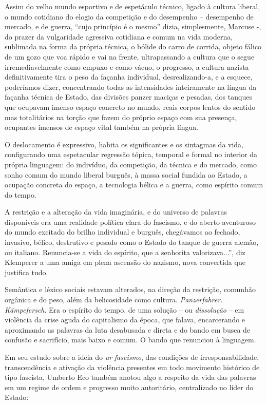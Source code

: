 Assim do velho mundo esportivo e de espetáculo técnico, ligado à cultura
liberal, o mundo cotidiano do elogio da competição e do desempenho --
desempenho de mercado, e de guerra, ``cujo princípio é o mesmo'' dizia,
simplesmente, Marcuse -, do prazer da vulgaridade agressiva cotidiana e
comum na vida moderna, sublimada na forma da própria técnica, o bólide
do carro de corrida, objeto fálico de um gozo que voa rápido e vai na
frente, ultrapassando a cultura que o segue irremediavelmente como
empuxo e como vácuo, o progresso, a cultura nazista definitivamente tira
o peso da façanha individual, desrealizando-a, e a esquece, poderíamos
dizer, concentrando todas as intensidades inteiramente na língua da
façanha técnica de Estado, das divisões panzer maciças e pesadas, dos
tanques que ocupavam imenso espaço concreto no mundo, reais corpos
lentos do sentido mas totalitários na torção que fazem do próprio espaço
com sua presença, ocupantes imensos de espaço vital também na própria
língua.

O deslocamento é expressivo, habita os significantes e os sintagmas da
vida, configurando uma espetacular regressão tópica, temporal e formal
no interior da própria linguagem: do indivíduo, da competição, da
técnica e do mercado, como sonho comum do mundo liberal burguês, à massa
social fundida ao Estado, a ocupação concreta do espaço, a tecnologia
bélica e a guerra, como espírito comum do tempo.

A restrição e a alteração da vida imaginária, e do universo de palavras
disponíveis era uma realidade política clara do fascismo, e do aberto
aventuroso do mundo excitado do brilho individual e burguês, chegávamos
ao fechado, invasivo, bélico, destrutivo e pesado como o Estado do
tanque de guerra alemão, ou italiano. Renuncia-se a vida do espírito,
que a senhorita valorizava...'', diz Klemperer a uma amiga em plena
ascensão do nazismo, nova convertida que justifica tudo.

Semântica e léxico sociais estavam alterados, na direção da restrição,
comunhão orgânica e do peso, além da belicosidade como cultura.
\emph{Panzerfahrer}. \emph{Kämpefersch}. Era o espírito do tempo, de uma
solução -- ou \emph{dissolução} -- em violência da crise aguda do
capitalismo da época, que falava, encarcerando e aproximando as palavras
da luta desabusada e direta e do bando em busca de confusão e
sacrifício, mais baixo e comum. O bando que renunciou à linguagem.

Em seu estudo sobre a ideia do \emph{ur} \emph{fascismo}, das condições
de irresponsabilidade, transcendência e ativação da violência presentes
em todo movimento histórico de tipo fascista, Umberto Eco também anotou
algo a respeito da vida das palavras em um regime de ordem e progresso
muito autoritário, centralizado no líder do Estado:

